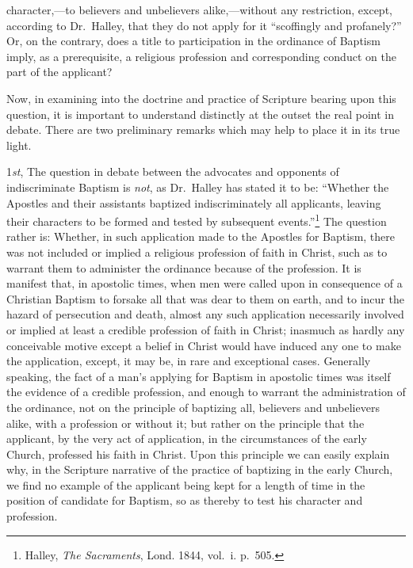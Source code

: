 \documentclass[english,]{book}
\begin{document}
character,---to believers and unbelievers alike,---without any restriction, except, according to Dr.~Halley, that they do not apply for it ``scoffingly and profanely?'' Or, on the contrary, does a title to participation in the ordinance of Baptism imply, as a prerequisite, a religious profession and corresponding conduct on the part of the applicant?

Now, in examining into the doctrine and practice of Scripture bearing upon this question, it is important to understand distinctly at the outset the real point in debate. There are two preliminary remarks which may help to place it in its true light.

1\emph{st}, The question in debate between the advocates and opponents of indiscriminate Baptism is \emph{not}, as Dr.~Halley has stated it to be: ``Whether the Apostles and their assistants baptized indiscriminately all applicants, leaving their characters to be formed and tested by subsequent events.''\footnote{Halley, \emph{The Sacraments}, Lond. 1844, vol.~i. p.~505.} The question rather is: Whether, in such application made to the Apostles for Baptism, there was not included or implied a religious profession of faith in Christ, such as to warrant them to administer the ordinance because of the profession. It is manifest that, in apostolic times, when men were called upon in consequence of a Christian Baptism to forsake all that was dear to them on earth, and to incur the hazard of persecution and death, almost any such application necessarily involved or implied at least a credible profession of faith in Christ; inasmuch as hardly any conceivable motive except a belief in Christ would have induced any one to make the application, except, it may be, in rare and exceptional cases. Generally speaking, the fact of a man's applying for Baptism in apostolic times was itself the evidence of a credible profession, and enough to warrant the administration of the ordinance, not on the principle of baptizing all, believers and unbelievers alike, with a profession or without it; but rather on the principle that the applicant, by the very act of application, in the circumstances of the early Church, professed his faith in Christ. Upon this principle we can easily explain why, in the Scripture narrative of the practice of baptizing in the early Church, we find no example of the applicant being kept for a length of time in the position of candidate for Baptism, so as thereby to test his character and profession.
\end{document}
